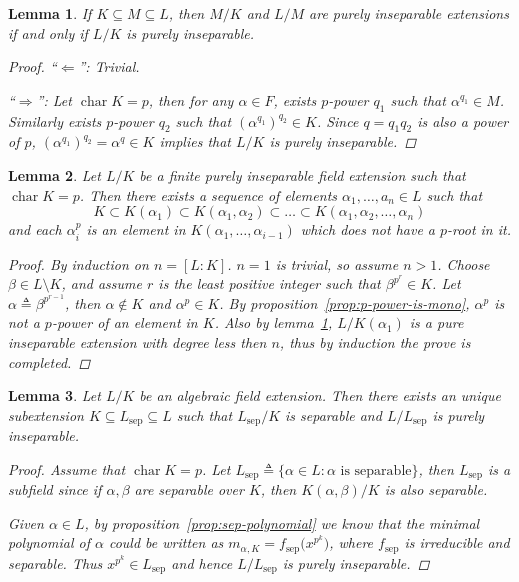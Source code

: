 \documentclass[a4paper]{article}
\newcommand{\defeq}{\triangleq}
\DeclareMathOperator{\Char}{char}
\newtheorem{lemma}{Lemma}
\theoremstyle{remark}
\theoremstyle{definition}
\theoremstyle{definition}
\theoremstyle{plain}
\begin{document}
  \begin{lemma} \label{lemma:stack-of-pure-ext}
    If $K \subseteq M \subseteq L$, then $M/K$ and $L/M$ are purely inseparable extensions
    if and only if $L / K$ is purely inseparable.
    \begin{proof}
      ``$\Leftarrow$'': Trivial.

      ``$\Rightarrow$'':
      Let $\Char K = p$, then for any $\alpha \in F$, exists $p$-power $q_1$ such that
      $\alpha^{q_1} \in M$. Similarly exists $p$-power $q_2$ such that $(\alpha^{q_1})^{q_2} \in K$.
      Since $q = q_1 q_2$ is also a power of $p$, $(\alpha^{q_1})^{q_2} = \alpha^q \in K$
      implies that $L/K$ is purely inseparable.
    \end{proof}
  \end{lemma}

  \begin{lemma} \label{lemma:building-tower}
    Let $L/K$ be a finite purely inseparable field extension such that $\Char K = p$.
    Then there exists a sequence of elements $\alpha_1, \dots, a_n \in L$ such that
    \[ K \subset K(\alpha_1) \subset K(\alpha_1, \alpha_2) \subset \dots \subset K(\alpha_1, \alpha_2, \dots, \alpha_n) \]
    and each $\alpha_i^p$ is an element in $K(\alpha_1, \dots, \alpha_{i-1})$ which
    does not have a $p$-root in it.

    \begin{proof}
      By induction on $n = [L: K]$. $n = 1$ is trivial, so assume $n > 1$.
      Choose $\beta \in L \setminus K$, and assume $r$ is the least positive integer
      such that $\beta^{p^r} \in K$. Let $\alpha \defeq \beta^{p^{r-1}}$, then $\alpha \not\in K$
      and $\alpha^p \in K$. By proposition~\ref{prop:p-power-is-mono}, $\alpha^p$ is not a $p$-power
      of an element in $K$. Also by lemma~\ref{lemma:stack-of-pure-ext}, $L / K(\alpha_1)$
      is a pure inseparable extension with degree less then $n$, thus by induction the prove is completed.
    \end{proof}
  \end{lemma}


  \begin{lemma} \label{lemma:decomp-of-insep}
    Let $L/K$ be an algebraic field extension. Then there exists an unique
    subextension $K \subseteq L_{\text{sep}} \subseteq L$ such that $L_{\text{sep}}/K$
    is separable and $L/L_{\text{sep}}$ is purely inseparable.

    \begin{proof}
      Assume that $\Char K = p$. Let $L_{\text{sep}} \defeq \{ \alpha \in L : \alpha \text{ is separable}\}$,
      then $L_{\text{sep}}$ is a subfield since if $\alpha, \beta$ are separable over $K$, then $K(\alpha, \beta)/K$
      is also separable.

      Given $\alpha \in L$, by proposition~\ref{prop:sep-polynomial} we know that the minimal
      polynomial of $\alpha$ could be written as $m_{\alpha, K} = f_\text{sep}\big(x^{p^k}\big)$,
      where $f_\text{sep}$ is irreducible and separable. Thus $x^{p^k} \in L_\text{sep}$ and
      hence $L/L_\text{sep}$ is purely inseparable.
    \end{proof}
  \end{lemma}
\end{document}
